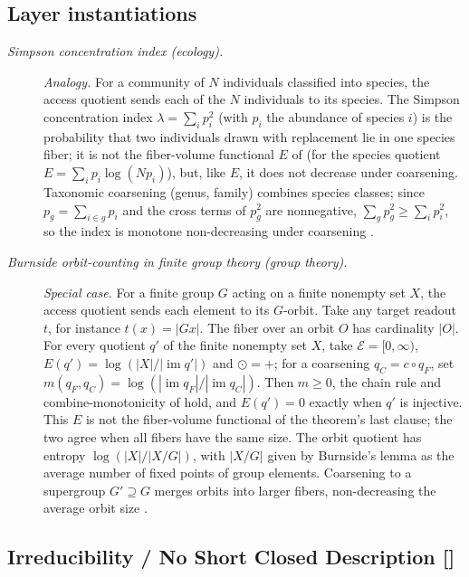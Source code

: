 \subsection*{Layer instantiations}\label{layer-inst:F39}

\begingroup\small
\begin{description}
\item[\emph{Simpson concentration index (ecology).}] \textit{Analogy.}
For a community of \(N\) individuals classified into
species, the access quotient sends each of the \(N\) individuals to its species.  The
Simpson concentration index
\(\lambda=\sum_i p_i^2\) (with \(p_i\) the abundance of
species \(i\)) is the probability that two individuals drawn with
replacement lie in one species fiber; it is not the fiber-volume functional
\(E\) of  (for the species quotient \(E=\sum_i p_i\log(Np_i)\)),
but, like \(E\), it does not decrease under coarsening.  Taxonomic coarsening (genus,
family) combines species classes; since
\(p_g=\sum_{i\in g}p_i\) and the cross terms of \(p_g^2\) are
nonnegative, \(\sum_g p_g^2\ge\sum_i p_i^2\), so the index is
monotone non-decreasing under coarsening
\citep{Simpson1949Diversity}.

\item[\emph{Burnside orbit-counting in finite group
theory (group theory).}] \textit{Special case.}
For a finite group \(G\) acting on a finite nonempty set \(X\),
the access quotient sends each element to its
\(G\)-orbit. Take any target readout \(t\), for instance \(t(x)=|Gx|\).  The fiber over an orbit \(O\) has
cardinality \(|O|\). For every quotient \(q'\) of the finite nonempty set
\(X\), take \(\mathcal E=[0,\infty)\), \(E(q')=\log(|X|/|\operatorname{im}q'|)\)
and \(\odot=+\); for a coarsening \(q_C=c\circ q_F\), set
\(m(q_F,q_C)=\log(|\operatorname{im}q_F|/|\operatorname{im}q_C|)\). Then
\(m\ge0\), the chain rule and combine-monotonicity of  hold, and
\(E(q')=0\) exactly when \(q'\) is injective.  This \(E\) is not the
fiber-volume functional of the theorem's last clause; the two agree
when all fibers have the same size. The orbit quotient has entropy
\(\log(|X|/|X/G|)\), with \(|X/G|\) given by
Burnside's lemma as the average number of fixed
points of group elements.  Coarsening to a supergroup
\(G'\supseteq G\) merges orbits into larger fibers,
non-decreasing the average orbit size
\citep{Burnside1897Theory}.

\end{description}
\endgroup


\subsection{Irreducibility / No Short Closed Description [\texorpdfstring{}{F42}]}\label{sec:self-reference-limits:irreducibility}

